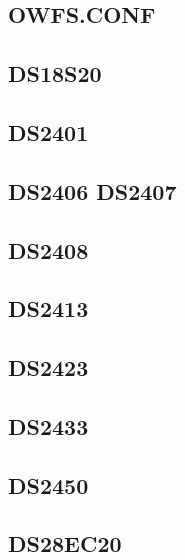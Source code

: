 

\subsection{OWFS.CONF}



\subsection{DS18S20}



\subsection{DS2401}



\subsection{DS2406 DS2407}



\subsection{DS2408}



\subsection{DS2413}



\subsection{DS2423}



\subsection{DS2433}



\subsection{DS2450}



\subsection{DS28EC20}


